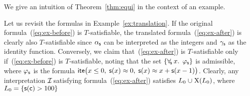 We give an intuition of Theorem~\ref{thm:equi} in the context of an example.
%
\begin{example}
Let us revisit the formulas in Example~\ref{ex:translation}.
If the original formula~(\ref{eq:ex-before}) is $T$-satisfiable, the translated
formula~(\ref{eq:ex-after}) is clearly also $T$-satisfiable since $\alpha_{\mathsf{s}}$ can be
interpreted as the integers and $\gamma_{\mathsf{s}}$ as the identity function.
%
Conversely, we claim that~(\ref{eq:ex-after}) is $T$-satisfiable
only if~(\ref{eq:ex-before}) is $T$-satisfiable, noting that the set
$\{ \forall_{\!\mathsf{s}\:} x.\;\, \varphi_{\mathsf{s}} \}$ is admissible,
where $\varphi_{\mathsf{s}}$ is the formula $\mathsf{ite}\bigl( x \leq 0,\allowbreak\; \mathsf{s}(x) \approx\nobreak 0,\allowbreak\; \mathsf{s}( x ) \approx x + \mathsf{s}( x-1 ) \bigr)$.
Clearly, any interpretation $\mathcal{I\!}$ satisfying formula~(\ref{eq:ex-after}) satisfies
$L_0 \cup \absconstraints( L_0 )$,
where $L_0 = \{ \mathsf{s}( \mathsf{c} ) > 100 \}$

\end{example}
